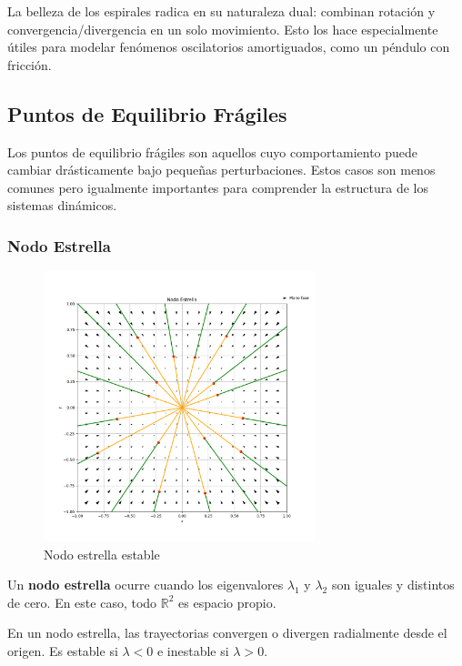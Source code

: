 La belleza de los espirales radica en su naturaleza dual: combinan rotación y convergencia/divergencia en un solo movimiento. Esto los hace especialmente útiles para modelar fenómenos oscilatorios amortiguados, como un péndulo con fricción.

\subsection{Puntos de Equilibrio Frágiles}

Los puntos de equilibrio frágiles son aquellos cuyo comportamiento puede cambiar drásticamente bajo pequeñas perturbaciones. Estos casos son menos comunes pero igualmente importantes para comprender la estructura de los sistemas dinámicos.

\subsubsection{Nodo Estrella}

\begin{figure}[h]
    \centering
    \includegraphics[width=0.7\textwidth]{Img/NodoEstrella.png}
    \caption{Nodo estrella estable}
    \label{fig:nodo_estrella}
\end{figure}

\begin{definition}
Un \textbf{nodo estrella} ocurre cuando los eigenvalores $\lambda_1$ y $\lambda_2$ son iguales y distintos de cero. En este caso, todo $\mathbb{R}^2$ es espacio propio.
\end{definition}

En un nodo estrella, las trayectorias convergen o divergen radialmente desde el origen. Es estable si $\lambda < 0$ e inestable si $\lambda > 0$.


